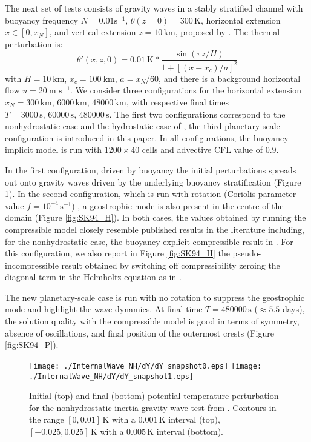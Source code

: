 \documentclass{ametsoc}
\theoremstyle{definition}
\begin{document}
The next set of tests consists of gravity waves in a stably stratified channel with buoyancy frequency $N=0.01\textrm{s}^{-1}$, $\theta(z=0)=300\,\textrm{K}$, horizontal extension $x\in[0,x_N]$, and vertical extension $z=10\,\textrm{km}$, proposed by \cite{SkamarockKlemp1994}. The thermal perturbation is:
%
\begin{equation}
 \theta'(x, z, 0)=0.01~\textrm{K}*\dfrac{\sin(\pi z/H)}{1+[(x-x_c)/a]^2}\label{eq: init_theta_pert_igw} 
\end{equation} 
%
with $H=10~\textrm{km}$, $x_c=100~\textrm{km}$, $a=x_N/60$, and there is a background horizontal flow $u=20~\textrm{m s}^{-1}$. We consider three configurations for the horizontal extension $x_N=300\,\textrm{km},\,6000\,\textrm{km},\,48000\,\textrm{km}$, with respective final times $T=3000\,\textrm{s},\,60000\,\textrm{s},\,480000\,\textrm{s}$. The first two configurations correspond to the nonhydrostatic case and the hydrostatic case of \cite{SkamarockKlemp1994}, the third planetary-scale configuration is introduced in this paper. In all configurations, the buoyancy-implicit model is run with $1200\times40$ cells and advective CFL value of 0.9. 

In the first configuration, driven by buoyancy the initial perturbations spreads out onto gravity waves driven by the underlying buoyancy stratification (Figure \ref{fig:SK94_NH}). In the second configuration, which is run with rotation (Coriolis parameter value $f=10^{-4}\,\textrm{s}^{-1}$) , a geostrophic mode is also present in the centre of the domain (Figure \ref{fig:SK94_H}). In both cases, the values obtained by running the compressible model closely resemble published results in the literature including, for the nonhydrostatic case, the buoyancy-explicit compressible result in \cite{BenacchioEtAl2014}. For this configuration, we also report in Figure \ref{fig:SK94_H} the pseudo-incompressible result obtained by switching off compressibility zeroing the diagonal term in the Helmholtz equation as in \cite{BenacchioEtAl2014, KleinBenacchio2016}.

The new planetary-scale case is run with no rotation to suppress the geostrophic mode and highlight the wave dynamics. At final time $T=480000\,\textrm{s}$ ($\approx5.5$ days), the solution quality with the compressible model is good in terms of symmetry, absence of oscillations, and final position of the outermost crests (Figure \ref{fig:SK94_P}).  

\begin{figure}
\centering
 \texttt{[image: ./InternalWave\_NH/dY/dY\_snapshot0.eps]}
 \texttt{[image: ./InternalWave\_NH/dY/dY\_snapshot1.eps]}
 \caption{Initial (top) and final (bottom) potential temperature perturbation for the nonhydrostatic inertia-gravity wave test from \cite{SkamarockKlemp1994}. Contours in the range $[0, 0.01]\,\textrm{K}$ with a $0.001\,\textrm{K}$ interval (top), $[-0.025, 0.025]\,\textrm{K}$ with a $0.005\,\textrm{K}$ interval (bottom).}
 \label{fig:SK94_NH}
\end{figure}
\end{document}
